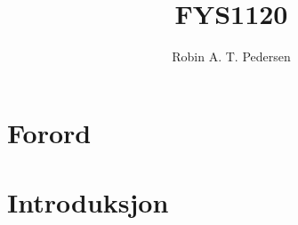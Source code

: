 \documentclass{article}
\begin{document}
  \title{FYS1120}
  \author{Robin A. T. Pedersen}
  \maketitle
  \tableofcontents

  \section{Forord}
    
  \section{Introduksjon}
    
\end{document}
